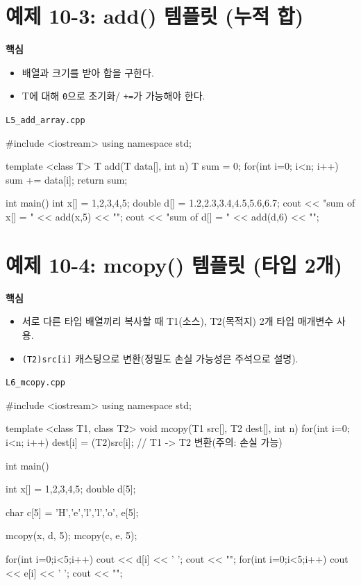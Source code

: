 \documentclass[11pt,a4paper]{article}
\newcommand{\filetag}[1]{\texttt{\color{Accent}#1}}
\begin{document}
\section{예제 10-3: add() 템플릿 (누적 합)}
\begin{GoalBox}
\textbf{핵심}
\begin{itemize}[leftmargin=18pt]
  \item 배열과 크기를 받아 합을 구한다.
  \item T에 대해 \texttt{0}으로 초기화/ \texttt{+=}가 가능해야 한다.
\end{itemize}
\end{GoalBox}

\noindent\filetag{L5\_add\_array.cpp}
\begin{cppcode}
#include <iostream>
using namespace std;

template <class T>
T add(T data[], int n) {
    T sum = 0;
    for(int i=0; i<n; i++) sum += data[i];
    return sum;
}

int main() {
    int x[] = {1,2,3,4,5};
    double d[] = {1.2,2.3,3.4,4.5,5.6,6.7};
    cout << "sum of x[] = " << add(x,5) << "\n";
    cout << "sum of d[] = " << add(d,6) << "\n";
}
\end{cppcode}

\section{예제 10-4: mcopy() 템플릿 (타입 2개)}
\begin{GoalBox}
\textbf{핵심}
\begin{itemize}[leftmargin=18pt]
  \item 서로 다른 타입 배열끼리 복사할 때 T1(소스), T2(목적지) 2개 타입 매개변수 사용.
  \item \texttt{(T2)src[i]} 캐스팅으로 변환(정밀도 손실 가능성은 주석으로 설명).
\end{itemize}
\end{GoalBox}

\noindent\filetag{L6\_mcopy.cpp}
\begin{cppcode}
#include <iostream>
using namespace std;

template <class T1, class T2>
void mcopy(T1 src[], T2 dest[], int n) {
    for(int i=0; i<n; i++)
        dest[i] = (T2)src[i]; // T1 -> T2 변환(주의: 손실 가능)
}

int main() {
    int x[] = {1,2,3,4,5};
    double d[5];

    char c[5] = {'H','e','l','l','o'}, e[5];

    mcopy(x, d, 5);
    mcopy(c, e, 5);

    for(int i=0;i<5;i++) cout << d[i] << ' ';
    cout << "\n";
    for(int i=0;i<5;i++) cout << e[i] << ' ';
    cout << "\n";
}
\end{cppcode}
\end{document}
